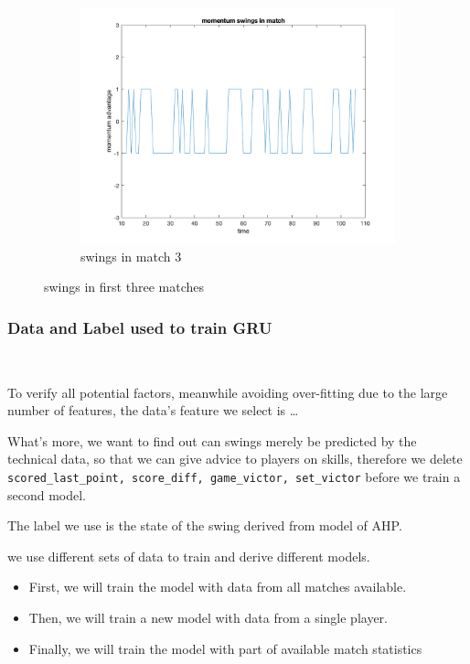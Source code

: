 \begin{figure}[H]
\begin{subfigure}[b]{0.34\textwidth}
        \includegraphics[width=\linewidth]{mainmatter/imgs/swing_match3.png}
        \caption{swings in match 3}
    \end{subfigure}
    \caption{swings in first three matches}
    \label{fig:swings in matches}
\end{figure}


\subsubsection{Data and Label used to train GRU}~{}

To verify all potential factors, meanwhile avoiding over-fitting due to the large number of features,
the data's feature we select is \dots

What's more, we want to find out can swings merely be predicted by the technical data,
so that we can give advice to players on skills,
therefore we delete \verb|scored_last_point, score_diff, game_victor, set_victor| before we train a second model.

The label we use is the state of the swing derived from model of AHP.

we use different sets of data to train and derive different models.

\begin{itemize}
    \item First, we will train the model with data from all matches available.
    \item Then, we will train a new model with data from a single player.
    \item Finally, we will train the model with part of available match statistics
\end{itemize}

